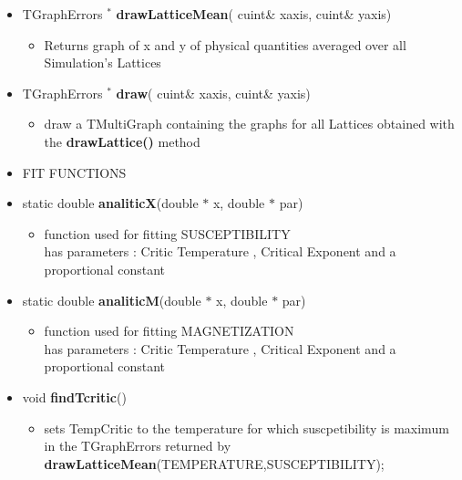 \begin{itemize}
\begin{itemize}
\begin{itemize}
    \end{itemize}

\newpage

  \item[] TGraphErrors ${}^*$ \textbf{drawLatticeMean}(
    cuint\& x\textunderscore axis,
    cuint\& y\textunderscore axis)
    \begin{itemize}
    \item[] Returns graph of x and y of physical quantities averaged over all Simulation's Lattices
    \end{itemize}

  \item[] TGraphErrors ${}^*$ \textbf{draw}(
    cuint\& x\textunderscore axis,
    cuint\& y\textunderscore axis)
    \begin{itemize}
    \item[] draw a TMultiGraph containing the graphs for all Lattices obtained with the \textbf{drawLattice()} method 
    \end{itemize}

  \item[] FIT FUNCTIONS \\

  \item[] static double \textbf{analiticX}(double $*$ x, double $*$ par)
    \begin{itemize}
    \item[] function used for fitting SUSCEPTIBILITY \\
    		has parameters : Critic Temperature , Critical Exponent and a proportional constant
    \end{itemize}

  \item[] static double \textbf{analiticM}(double $*$ x, double $*$ par)
    \begin{itemize}
    \item[] function used for fitting MAGNETIZATION \\
    		has parameters : Critic Temperature , Critical Exponent and a proportional constant
    \end{itemize}

  \item[] void \textbf{findTcritic}()
    \begin{itemize}
    \item[] sets TempCritic to the temperature for which suscpetibility is maximum in the TGraphErrors returned by \textbf{drawLatticeMean}(TEMPERATURE,SUSCEPTIBILITY);
    \end{itemize}


\end{itemize}
\end{itemize}
